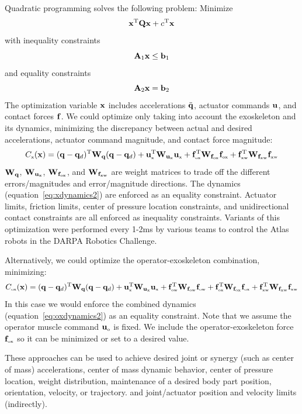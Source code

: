 \documentclass[letterpaper,12pt,fullpage]{article}
\newcommand{\myo}{{\mbox {\tiny o}}}
\newcommand{\myx}{{\mbox {\tiny x}}}
\newcommand{\ox}{{\mbox {\tiny ox}}}
\newcommand{\ow}{{\mbox {\tiny ow}}}
\newcommand{\xw}{{\mbox {\tiny xw}}}
\begin{document}
Quadratic programming
solves the following problem:
Minimize
\begin{equation}
{\bf x}^{{\rm T}} {\bf Q} {\bf x} + c^{{\rm T}} {\bf x}
\end{equation}
with inequality constraints
\begin{equation}
{\bf A}_1 {\bf x} \le {\bf b}_1
\end{equation}
and equality constraints
\begin{equation}
{\bf A}_2 {\bf x} = {\bf b}_2
\end{equation}
The optimization variable ${\bf x}$ includes accelerations $\ddot{{\bf q}}$, actuator
commands ${\bf u}$, and contact forces ${\bf f}$.
We could optimize only taking into account the exoskeleton and its dynamics,
minimizing the discrepancy between actual and desired accelerations, actuator command
magnitude, and contact force magnitude:
\begin{equation}
C_{\myx}(\vx) = (\vq - \vq_d)^{\tr} \mW_{\vq} (\vq - \vq_d)
+ \vu_{\myx}^{\tr} \mW_{\vu_{\myx}} \vu_{\myx}
+ \vf_{\ox}^{\tr} \mW_{\vf_{\ox}} \vf_{\ox}
+ \vf_{\xw}^{\tr} \mW_{\vf_{\xw}} \vf_{\xw}
\end{equation}
${\bf W}_{{\bf q}}$, $\mW_{\vu_{\myx}}$, $\mW_{\vf_{\ox}}$,
and $\mW_{\vf_{\xw}}$ are weight matrices to trade off the
different errors/magnitudes and error/magnitude directions.
The dynamics (equation~\ref{eq:xdynamics2}) are enforced as an equality constraint.
Actuator limits, friction limits, center of pressure location constraints,
and unidirectional contact constraints are all
enforced as inequality constraints.
Variants of this optimization
were performed every 1-2ms by various teams to control the
Atlas robots in the DARPA Robotics Challenge.

Alternatively, we could optimize the operator-exoskeleton combination,
minimizing:
\begin{equation}
C_{\ox}(\vx) = (\vq - \vq_d)^{\tr} \mW_{\vq} (\vq - \vq_d) 
+ \vu^{\tr}_{\myx} \mW_{\vu_{\myx}} \vu_{\myx}
+ \vf_{\ow}^{\tr} \mW_{\vf_{\ow}} \vf_{\ow}
+ \vf_{\ox}^{\tr} \mW_{\vf_{\ox}} \vf_{\ox}
+ \vf_{\xw}^{\tr} \mW_{\vf_{\xw}} \vf_{\xw}
\end{equation}
In this case we would enforce the combined 
dynamics (equation~\ref{eq:oxdynamics2}) as an equality constraint.
Note that we assume the operator muscle command
$\vu_{\myo}$ is fixed.
We include the operator-exoskeleton force $\vf_{\ox}$ so it can be minimized or set to
a desired value.

These approaches can be used to achieve desired joint or synergy (such as center
of mass) accelerations, center of mass dynamic behavior, center of pressure location,
weight distribution, maintenance of a desired body part position, orientation,
velocity, or trajectory. and joint/actuator position and velocity limits (indirectly).
\end{document}
